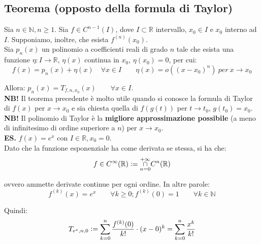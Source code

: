 \documentclass{article}
\begin{document}
\subsection{Teorema (opposto della formula di Taylor)}
Sia $n \in \mathbb{N}, n \geq 1$. Sia $f \in C^{n - 1}(I)$, dove $I \subset \mathbb{R}$ intervallo, $x_0 \in I$ e $x_0$ interno ad $I$. Supponiamo, inoltre, che esista $f^{(n)}(x_0)$.\\
Sia $p_n(x)$ un polinomio a coefficienti reali di grado $n$ tale che esista una funzione $\eta: I \xrightarrow{} \mathbb{R}$, $\eta(x)$ continua in $x_0$, $\eta(x_0) = 0$, per cui:
\begin{equation*}
    f(x) = p_n(x) + \eta(x) \quad \forall x \in I \qquad \eta(x) = o((x - x_0)^n) \ per \ x \to x_0 
\end{equation*}

\noindent Allora: $p_n(x) = T_{f, n, x_0}(x) \qquad \forall x \in I$.\\

\noindent\textbf{NB!} Il teorema precedente è molto utile quando si conosce la formula di Taylor di $f(x)$ per $x \to x_0$ e sia chiesta quella di $f(g(t))$ per $t \to t_0$, $g(t_0) = x_0$.\\

\noindent\textbf{NB!} Il polinomio di Taylor è la \textbf{migliore approssimazione possibile} (a meno di infinitesimo di ordine superiore a $n$) per $x \to x_0$.\\

\noindent\textbf{ES.} $f(x) = e^x$ con $I \in \mathbb{R}, x_0 = 0$.\\
Dato che la funzione esponenziale ha come derivata se stessa, si ha che:
\begin{equation*}
    f \in C^\infty(\mathbb{R}) \vcentcolon = \overset{+\infty}{\underset{n = 0}{\cap}} C^n(\mathbb{R})
\end{equation*}

\noindent ovvero ammette derivate continue per ogni ordine. In altre parole:
\begin{equation*}
    f^{(k)}(x) = e^x \qquad \forall k \geq 0; f^{(k)}(0) = 1 \qquad \forall k \in \mathbb{N}
\end{equation*}

\noindent Quindi:
\begin{equation*}
    T_{e^x, n, 0} \vcentcolon = \sum_{k = 0}^n \frac{f^{(k)}(0)}{k!} \cdot (x - 0)^k = \sum_{k = 0}^n \frac{x^k}{k!}
\end{equation*}
\end{document}
